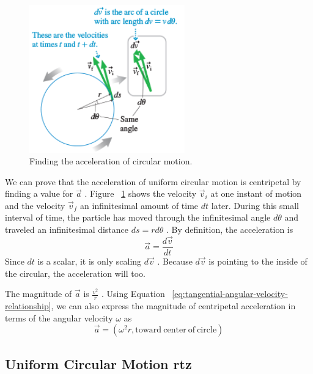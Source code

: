 \begin{figure}
    \centering
    \includegraphics[width=0.6\textwidth]{../figures/finding-circular-motion-acceleration.png}
    \caption{Finding the acceleration of circular motion.}%
    \label{fig:circular-motion-acceleration}
\end{figure}

We can prove that the acceleration of uniform circular motion is
centripetal by finding a value for
$
    \vec{a}
$%
.  Figure~%
\ref{fig:circular-motion-acceleration} shows the velocity
$
    \vec{v}_i
$ at one instant of motion and the velocity
$
    \vec{v}_f
$ an infinitesimal amount of time
$
    dt
$ later.  During this small interval of time, the particle has moved
through the infinitesimal angle
$
    d\theta
$ and traveled an infinitesimal distance
$
    ds=r{d\theta}
$%
.  By definition, the acceleration is
\begin{equation}
    \vec{a}=\frac{d\vec{v}}{dt}
\end{equation}
Since
$
    dt
$ is a scalar, it is only scaling
$
    d\vec{v}
$%
.  Because
$
    d\vec{v}
$ is pointing to the inside of the circular, the acceleration will too.

The magnitude of
$
    \vec{a}
$ is
$
    \frac{v^2}{r}
$%
.  Using Equation~%
\ref{eq:tangential-angular-velocity-relationship}, we can also express
the magnitude of centripetal acceleration in terms of the angular
velocity
$
    \omega
$ as
\begin{equation}
    \vec{a}=\left(\omega^2r,\mathrm{toward~center~of~circle}\right)
\end{equation}

\subsection{Uniform Circular Motion rtz}

